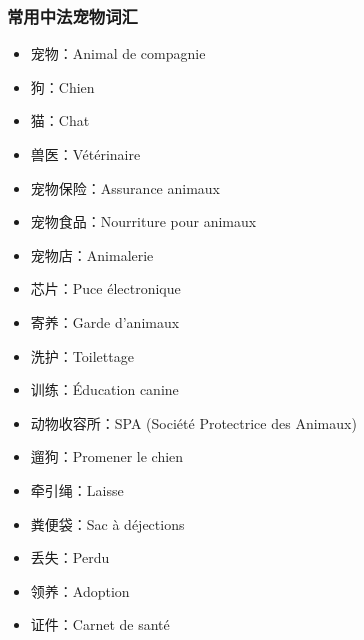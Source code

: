 \subsubsection{常用中法宠物词汇}
\begin{itemize}
    \item 宠物：Animal de compagnie
    \item 狗：Chien
    \item 猫：Chat
    \item 兽医：Vétérinaire
    \item 宠物保险：Assurance animaux
    \item 宠物食品：Nourriture pour animaux
    \item 宠物店：Animalerie
    \item 芯片：Puce électronique
    \item 寄养：Garde d’animaux
    \item 洗护：Toilettage
    \item 训练：Éducation canine
    \item 动物收容所：SPA (Société Protectrice des Animaux)
    \item 遛狗：Promener le chien
    \item 牵引绳：Laisse
    \item 粪便袋：Sac à déjections
    \item 丢失：Perdu
    \item 领养：Adoption
    \item 证件：Carnet de santé
\end{itemize}
